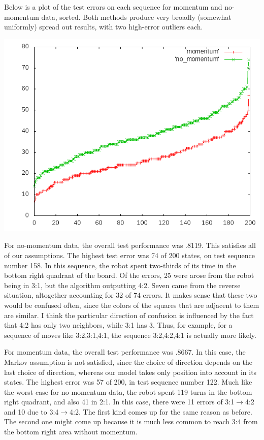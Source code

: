 \documentclass{article}
\begin{document}
\begin{enumerate}[(a)]
\begin{enumerate}
    Below is a plot of the test errors on each sequence for momentum
    and no-momentum data, sorted. Both methods produce very broadly
    (somewhat uniformly) spread out results, with two high-error
    outliers each.
    \begin{center}
      \includegraphics[scale=.5]{robot_cumul_perf.png}
    \end{center}

    For no-momentum data, the overall test performance was .8119. This
    satisfies all of our assumptions. The highest test error was 74 of
    200 states, on test sequence number 158. In this sequence, the
    robot spent two-thirds of its time in the bottom right quadrant of
    the board. Of the errors, 25 were arose from the robot being in
    3:1, but the algorithm outputting 4:2. Seven came from the reverse
    situation, altogether accounting for 32 of 74 errors. It makes
    sense that these two would be confused often, since the colors of
    the squares that are adjacent to them are similar. I think the
    particular direction of confusion is influenced by the fact that
    4:2 has only two neighbors, while 3:1 has 3. Thus, for example,
    for a sequence of moves like 3:2,3:1,4:1, the sequence 3:2,4:2,4:1
    is actually more likely.

    For momentum data, the overall test performance was .8667. In this
    case, the Markov assumption is not satisfied, since the choice of
    direction depends on the last choice of direction, whereas our
    model takes only position into account in its states. The highest
    error was 57 of 200, in test sequence number 122. Much like the
    worst case for no-momentum data, the robot spent 119 turns in the
    bottom right quadrant, and also 41 in 2:1. In this case, there
    were 11 errors of 3:1$\to$4:2 and 10 due to 3:4$\to$4:2. The first
    kind comes up for the same reason as before. The second one might
    come up because it is much less common to reach 3:4 from the
    bottom right area without momentum.


\end{enumerate}
\end{enumerate}
\end{document}
